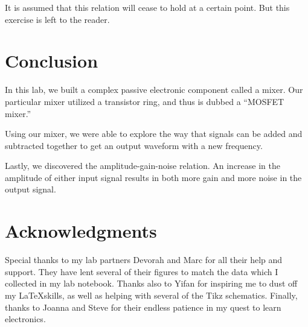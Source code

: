 \documentclass[lettersize,journal]{IEEEtran}
\begin{document}
It is assumed that this relation will cease to hold at a certain point. But this exercise is left to the reader.

\section{Conclusion}

In this lab, we built a complex passive electronic component called a mixer. Our particular mixer utilized a transistor ring, and thus is dubbed a ``MOSFET mixer.''

Using our mixer, we were able to explore the way that signals can be added and subtracted together to get an output waveform with a new frequency.

Lastly, we discovered the amplitude-gain-noise relation. An increase in the amplitude of either input signal results in both more gain and more noise in the output signal.

\section*{Acknowledgments}
Special thanks to my lab partners Devorah and Marc for all their help and support. They have lent several of their figures to match the data which I collected in my lab notebook. Thanks also to Yifan for inspiring me to dust off my \LaTeX skills, as well as helping with several of the Tikz schematics. Finally, thanks to Joanna and Steve for their endless patience in my quest to learn electronics.



% 


\end{document}
